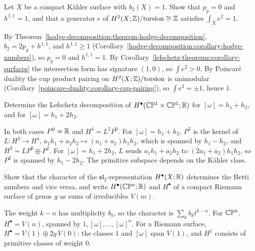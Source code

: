\begin{exercise}\label{lefschetz-theorems:exercise-b2-kahler-surface}
Let $X$ be a compact K\"ahler surface with $b_2(X) = 1$. Show that $p_g = 0$ and $h^{1,1} = 1$, and that a generator $e$ of
$H^2(X; \mathbb{Z})/\mathrm{torsion} \cong \mathbb{Z}$ satisfies $\int_Xe^2 = 1$.
\end{exercise}

\begin{solution}
By Theorem~\ref{hodge-decomposition:theorem-hodge-decomposition}, $b_2 = 2p_g + h^{1,1}$, and $h^{1,1} \geq 1$
(Corollary~\ref{hodge-decomposition:corollary-hodge-numbers}), so $p_g = 0$ and $h^{1,1} = 1$. By
Corollary~\ref{lefschetz-theorems:corollary-surfaces} the intersection form has signature $(1, 0)$, so $\int e^2 > 0$. By Poincar\'e duality
the cup product pairing on $H^2(X; \mathbb{Z})/\mathrm{torsion}$ is unimodular (Corollary~\ref{poincare-duality:corollary-cup-pairing}), so
$\int e^2 = \pm 1$, hence $1$.
\end{solution}

\begin{exercise}\label{lefschetz-theorems:exercise-primitive-cp1-squared}
Determine the Lefschetz decomposition of $H^\bullet(\mathbb{C}\mathbb{P}^1 \times \mathbb{C}\mathbb{P}^1; \mathbb{R})$ for $[\omega] = h_1 + h_2$, and for
$[\omega] = h_1 + 2h_2$.
\end{exercise}

\begin{solution}
In both cases $P^0 = \mathbb{R}$ and $H^4 = L^2P^0$. For $[\omega] = h_1 + h_2$, $P^2$ is the kernel of $L \colon H^2 \to H^4$,
$a_1h_1 + a_2h_2 \mapsto (a_1 + a_2)h_1h_2$, which is spanned by $h_1 - h_2$, and $H^2 = LP^0 \oplus P^2$. For $[\omega] = h_1 + 2h_2$, $L$
sends $a_1h_1 + a_2h_2$ to $(2a_1 + a_2)h_1h_2$, so $P^2$ is spanned by $h_1 - 2h_2$. The primitive subspace depends on the K\"ahler class.
\end{solution}

\begin{exercise}\label{lefschetz-theorems:exercise-sl2-weights-cohomology}
Show that the character of the $\mathfrak{sl}_2$-representation $H^\bullet(X; \mathbb{R})$ determines the Betti numbers and vice versa, and write
$H^\bullet(\mathbb{C}\mathbb{P}^n; \mathbb{R})$ and $H^\bullet$ of a compact Riemann surface of genus $g$ as sums of irreducibles $V(m)$.
\end{exercise}

\begin{solution}
The weight $k - n$ has multiplicity $b_k$, so the character is $\sum_kb_kt^{k-n}$. For $\mathbb{C}\mathbb{P}^n$, $H^\bullet = V(n)$, spanned by
$1, [\omega], \ldots, [\omega]^n$. For a Riemann surface, $H^\bullet = V(1) \oplus 2g\,V(0)$: the classes $1$ and $[\omega]$ span $V(1)$, and $H^1$
consists of primitive classes of weight $0$.
\end{solution}

